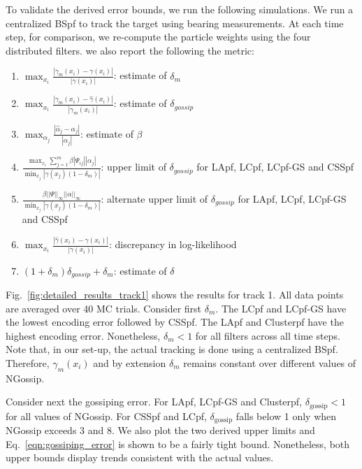 \documentclass[10pt,letterpaper,final]{article}
\begin{document}
To validate the derived error bounds, we run the following simulations. We run a centralized BSpf to track the target using bearing measurements. At each time step, for comparison, we re-compute the particle weights using the four distributed filters. we also report the following the metric:
\begin{enumerate}
\item $\max_{x_i} \frac{|\gamma_{m}(x_i)-\gamma(x_i)|}{|\gamma(x_i)|}$: estimate of $\delta_m$
\item $\max_{x_i} \frac{|\gamma_m(x_i)-\hat{\gamma}(x_i)|}{|\gamma_m(x_i)|}$: estimate of $\delta_{gossip}$ 
\item $\max_{\alpha_j} \frac{\left\vert \hat{\alpha}_j -\alpha_j \right\vert}{|\alpha_j|}$: estimate of $\beta$
\item $\frac{\max_{x_i}\sum_{j=1}^m\beta \left\vert \Psi_{ij}\right\vert \left\vert\alpha_j\right\vert}{\min_{x_j}|\gamma(x_j)(1-\delta_m)|}$: upper limit of $\delta_{gossip}$ for LApf, LCpf, LCpf-GS and CSSpf
\item $\frac{\beta ||\Psi||_\infty ||\alpha||_\infty}{\min_{x_j}|\gamma(x_j)(1-\delta_m)|}$: alternate upper limit of $\delta_{gossip}$ for LApf, LCpf, LCpf-GS and CSSpf
\item $\max_{x_i} \frac{|\hat{\gamma}(x_i) - \gamma(x_i)|}{|\gamma(x_i)|}$: discrepancy in log-likelihood
\item $(1+\delta_m)\delta_{gossip} + \delta_m$: estimate of $\delta$
\end{enumerate}

Fig.~\ref{fig:detailed_results_track1} shows the results for track 1. All data points are averaged over 40 MC trials. Consider first $\delta_m$. The LCpf and LCpf-GS have the lowest encoding error followed by CSSpf. The LApf and Clusterpf have the highest encoding error. Nonetheless, $\delta_m<1$ for all filters across all time steps. Note that, in our set-up, the actual tracking is done using a centralized BSpf. Therefore, $\gamma_m(x_i)$ and by extension $\delta_m$ remains constant over different values of NGossip.

Consider next the gossiping error. For LApf, LCpf-GS and Clusterpf, $\delta_{\text{gossip}}<1$ for all values of NGossip. For CSSpf and LCpf, $\delta_{\text{gossip}}$ falls below 1 only when NGossip exceeds 3 and 8. We also plot the two derived upper limits and Eq.~\ref{eqn:gossiping_error} is shown to be a fairly tight bound. Nonetheless, both upper bounds display trends consistent with the actual values. 
\end{document}
